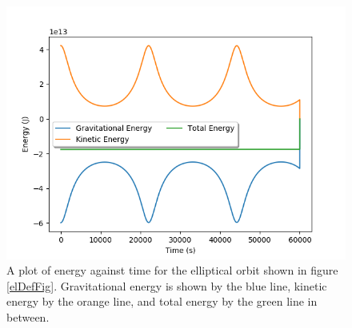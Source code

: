 \documentclass[twocolumn,prl,nobalancelastpage,aps,10pt]{revtex4-1}
\begin{document}
\begin{figure}[ht]
	\includegraphics*[width=0.96\linewidth,clip]{ellipticalDefaultEnergy}
	\caption{A plot of energy against time for the elliptical orbit shown in figure \ref{elDefFig}. Gravitational energy is shown by the blue line, kinetic energy by the orange line, and total energy by the green line in between.} \label{elDefEn}
\end{figure}
\end{document}
